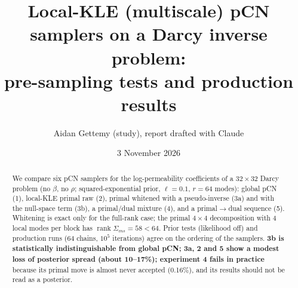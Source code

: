 \documentclass[11pt]{article}
\title{Local-KLE (multiscale) pCN samplers on a Darcy inverse problem:\\ pre-sampling tests and production results}
\author{Aidan Gettemy (study), report drafted with Claude}
\date{3 November 2026}
\begin{document}
\maketitle

\begin{abstract}
We compare six pCN samplers for the log-permeability coefficients of a $32\times32$ Darcy problem (no $\beta$, no $\rho$; squared-exponential prior, $\ell=0.1$, $r=64$ modes): global pCN (1), local-KLE primal raw (2), primal whitened with a pseudo-inverse (3a) and with the null-space term (3b), a primal/dual mixture (4), and a primal$\to$dual sequence (5). Whitening is exact only for the full-rank case; the primal $4\times4$ decomposition with 4 local modes per block has $\operatorname{rank}\Sigma_{ms}=58<64$. Prior tests (likelihood off) and production runs (64 chains, $10^5$ iterations) agree on the ordering of the samplers. \textbf{3b is statistically indistinguishable from global pCN; 3a, 2 and 5 show a modest loss of posterior spread (about 10--17\%); experiment 4 fails in practice} because its primal move is almost never accepted (0.16\%), and its results should not be read as a posterior.
\end{abstract}
\end{document}
